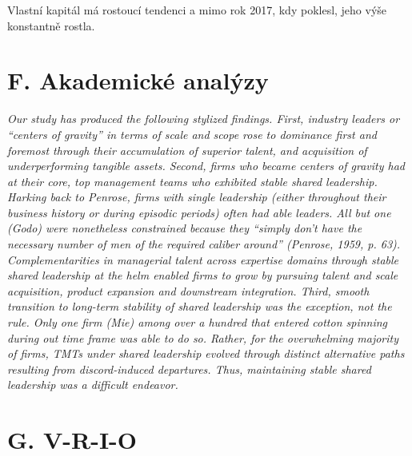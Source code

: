 Vlastní kapitál má rostoucí tendenci a mimo rok 2017, kdy poklesl, jeho výše konstantně rostla.\\

\newpage

\section*{F. Akademické analýzy}
\label{sec:Akademicke analyzy}

\textit{Our study has produced the following stylized findings. First, industry leaders or “centers of gravity” in terms of scale and scope rose to dominance first and foremost through their accumulation of superior talent, and acquisition of underperforming tangible assets. Second, firms who became centers of gravity had at their core, top management teams who exhibited stable shared leadership. Harking back to Penrose, firms with single leadership (either throughout their business history or during episodic periods) often had able leaders. All but one (Godo) were nonetheless constrained because they “simply don’t have the necessary number of men of the required caliber around” (Penrose, 1959, p. 63). Complementarities in managerial talent across expertise domains through stable shared leadership at the helm enabled firms to grow by pursuing talent and scale acquisition, product expansion and downstream integration. Third, smooth transition to long-term stability of shared leadership was the exception, not the rule. Only one firm (Mie) among over a hundred that entered cotton spinning during out time frame was able to do so. Rather, for the overwhelming majority of firms, TMTs under shared leadership evolved through distinct alternative paths resulting from discord-induced departures. Thus, maintaining stable shared leadership was a difficult endeavor.}

\section*{G. V-R-I-O}
\label{sec:V-R-I-O}

